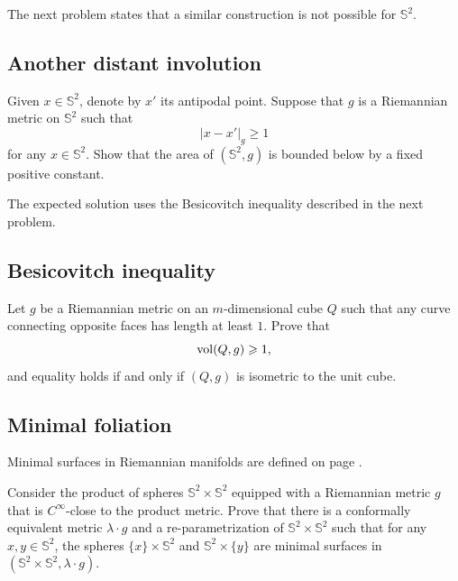 The next problem states that a similar construction is not possible for $\mathbb{S}^2$.


\subsection*{Another distant involution}
\label{Another distant involution}

\begin{pr}
Given $x\in \mathbb{S}^2$, denote by $x'$ its antipodal point.
Suppose that $g$ is a Riemannian metric on $\mathbb{S}^2$ such that
\[|x-x'|_g\ge1\]
for any $x\in\mathbb{S}^2$.
Show that the area of $(\mathbb{S}^2,g)$ is bounded below by a fixed positive constant. 
\end{pr}

The expected solution uses the Besicovitch inequality described in the next problem.


\subsection*{Besicovitch inequality}
\label{Besicovitch inequality}

\begin{pr}
Let $g$ be a Riemannian metric on an $m$-dimensional cube $Q$ such that any curve connecting opposite faces has length at least $1$. 
Prove that 
\[\operatorname{\rm vol}\nolimits(Q,g)\geqslant 1,\] 
and equality holds if and only if $(Q,g)$ is isometric to the unit cube.
\end{pr}



\subsection*{Minimal foliation\thm}
\label{gromomorphic-curves}

Minimal surfaces in Riemannian manifolds are defined on page \pageref{minimal surface}.

\begin{pr}
Consider the product of spheres $\mathbb{S}^2\times \mathbb{S}^2$ equipped with a Riemannian metric $g$ that is $C^\infty$-close to the product metric. 
Prove that there is a conformally equivalent metric $\lambda\cdot g$ and a re-parametrization of $\mathbb{S}^2\times \mathbb{S}^2$
such that for any $x,y\in \mathbb{S}^2$, the spheres $\{x\}\times\mathbb{S}^2$ and $\mathbb{S}^2\times \{y\}$ are minimal surfaces 
in $(\mathbb{S}^2\times \mathbb{S}^2,\lambda\cdot g)$.
\end{pr}


